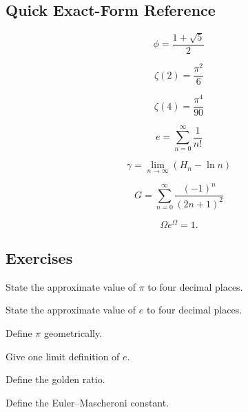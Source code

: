 \subsection{Quick Exact-Form Reference}
\label{subsec:quick-exact-constant-reference}

\[
\boxed{
\phi
=
\frac{1+\sqrt5}{2}
}
\]

\[
\boxed{
\zeta(2)
=
\frac{\pi^2}{6}
}
\]

\[
\boxed{
\zeta(4)
=
\frac{\pi^4}{90}
}
\]

\[
\boxed{
e
=
\sum_{n=0}^{\infty}
\frac{1}{n!}
}
\]

\[
\boxed{
\gamma
=
\lim_{n\to\infty}
\left(
H_n-\ln n
\right)
}
\]

\[
\boxed{
G
=
\sum_{n=0}^{\infty}
\frac{(-1)^n}{(2n+1)^2}
}
\]

\[
\boxed{
\Omega e^\Omega=1.
}
\]

\subsection{Exercises}
\label{subsec:mathematical-constants-exercises}

\begin{exercise}[1]
State the approximate value of \(\pi\) to four decimal places.
\end{exercise}

\begin{exercise}[1]
State the approximate value of \(e\) to four decimal places.
\end{exercise}

\begin{exercise}[1]
Define \(\pi\) geometrically.
\end{exercise}

\begin{exercise}[1]
Give one limit definition of \(e\).
\end{exercise}

\begin{exercise}[1]
Define the golden ratio.
\end{exercise}

\begin{exercise}[1]
Define the Euler--Mascheroni constant.
\end{exercise}


